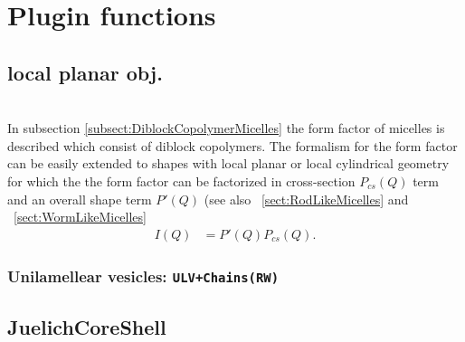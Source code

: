 \chapter{Plugin functions}
\label{ch:plugins}


\section{local planar obj.} ~\\
\label{plugin:LocalPlanar)}
In subsection
\ref{subsect:DiblockCopolymerMicelles} the form factor of micelles
is described which consist of diblock copolymers. The formalism
for the form factor can be easily extended to shapes with local
planar or local cylindrical geometry
\cite{PedersenJApplCryst2000,Neugebauer1943} for which the the
form factor can be factorized in cross-section $P_{cs}(Q)$ term
and an overall shape term $P'(Q)$ (see also
~\ref{sect:RodLikeMicelles} and ~\ref{sect:WormLikeMicelles}
\begin{align}
I(Q) &=P'(Q) P_{cs}(Q).
\end{align}
\subsection{Unilamellear vesicles: \texttt{ULV+Chains(RW)}}
\label{plugin:ULV+Chains(RW)}


\clearpage
\section{JuelichCoreShell} ~\\

